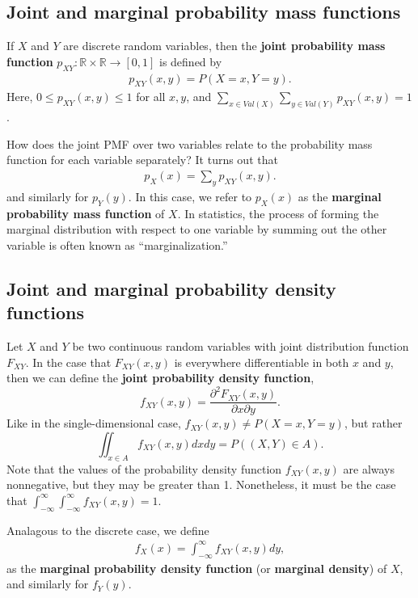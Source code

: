 \documentclass{article}
\begin{document}
\subsection{Joint and marginal probability mass functions}

If $X$ and $Y$ are discrete random variables, then the \textbf{joint probability mass function} $p_{XY} : \mathbb{R} \times \mathbb{R} \rightarrow [0,1]$ is
defined by
\begin{eqnarray*}
  p_{XY}(x,y) = P(X = x, Y = y).
\end{eqnarray*}
Here, $0 \le p_{XY}(x,y) \le 1$ for all $x, y$, and $\sum_{x \in Val(X)} \sum_{y \in Val(Y)} p_{XY}(x,y) = 1$.

How does the joint PMF over two variables relate to the probability mass function for each variable separately? 
It turns out that
\begin{eqnarray*}
  p_X(x) = \sum_y p_{XY} (x,y).
\end{eqnarray*}
and similarly for $p_Y(y)$.  In this case, we refer to $p_X(x)$ as the
\textbf{marginal probability mass function} of $X$.  In statistics, the process of forming the
marginal distribution with respect to one variable by summing out the
other variable is often known as ``marginalization.''

\subsection{Joint and marginal probability density functions}

Let $X$ and $Y$ be two continuous random variables with joint distribution function $F_{XY}$.  In the case that
$F_{XY}(x,y)$ is everywhere differentiable in both $x$ and $y$, then we can define the \textbf{joint probability density function},
\begin{equation*}
  f_{XY}(x,y)= \frac{ \partial^2 F_{XY}(x,y)}{\partial x \partial y}.
\end{equation*}
Like in the single-dimensional case, $f_{XY}(x,y) \neq P(X = x, Y = y)$, but rather
\begin{equation*}
  \iint_{x \in A} f_{XY} (x,y) dx dy = P((X,Y) \in A).
\end{equation*}
Note that the values of the probability density function $f_{XY}(x,y)$ are always nonnegative, but they may be greater than 1.  Nonetheless, it must be the
case that $\int_{-\infty}^\infty \int_{-\infty}^\infty f_{XY}(x,y) = 1$.

Analagous to the discrete case, we define
\begin{eqnarray*}
  f_X(x) = \int_{-\infty}^{\infty}f_{XY}(x,y)dy,
\end{eqnarray*}
as the \textbf{marginal probability density function} (or \textbf{marginal
  density}) of $X$, and similarly for $f_Y(y)$.
\end{document}
